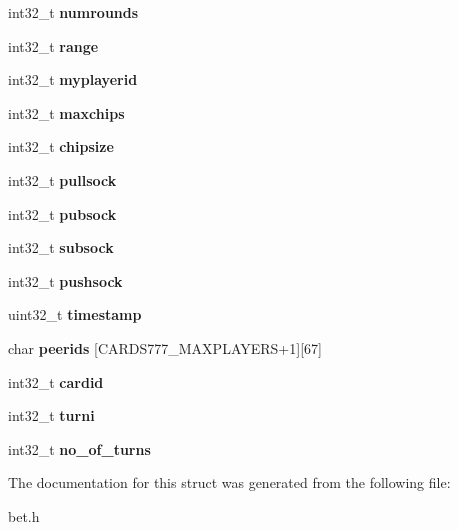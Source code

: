 \begin{DoxyCompactItemize}
\item 
\mbox{\label{structprivatebet__info_ae9386be7e568fdb22e00cb600834fc7b}} 
int32\+\_\+t {\bfseries numrounds}
\item 
\mbox{\label{structprivatebet__info_af01242479bf0e4175782043883b177f8}} 
int32\+\_\+t {\bfseries range}
\item 
\mbox{\label{structprivatebet__info_ad502ebd5a1f56f383db682da311e813e}} 
int32\+\_\+t {\bfseries myplayerid}
\item 
\mbox{\label{structprivatebet__info_a195fee78bb1a26504e4920dafea3b195}} 
int32\+\_\+t {\bfseries maxchips}
\item 
\mbox{\label{structprivatebet__info_a1f4c834e20b87839446da22179d2e58b}} 
int32\+\_\+t {\bfseries chipsize}
\item 
\mbox{\label{structprivatebet__info_a5a624f46decb6be461ec1e4edc0cc140}} 
int32\+\_\+t {\bfseries pullsock}
\item 
\mbox{\label{structprivatebet__info_a2443f8a982fb92f3cab78d35d54aeb24}} 
int32\+\_\+t {\bfseries pubsock}
\item 
\mbox{\label{structprivatebet__info_adf0111f2d0328b929100e926427b5ced}} 
int32\+\_\+t {\bfseries subsock}
\item 
\mbox{\label{structprivatebet__info_aa04b8bcf4acf5ced8cfeaa006cc69249}} 
int32\+\_\+t {\bfseries pushsock}
\item 
\mbox{\label{structprivatebet__info_a41d485812c76258fe86aa2ebb0a43e3b}} 
uint32\+\_\+t {\bfseries timestamp}
\item 
\mbox{\label{structprivatebet__info_a3aa8ce19463aa786e93e92ac4759a6bd}} 
char {\bfseries peerids} \mbox{[}C\+A\+R\+D\+S777\+\_\+\+M\+A\+X\+P\+L\+A\+Y\+E\+RS+1\mbox{]}\mbox{[}67\mbox{]}
\item 
\mbox{\label{structprivatebet__info_ac1a593b6b04f50e52892def22a3fdd53}} 
int32\+\_\+t {\bfseries cardid}
\item 
\mbox{\label{structprivatebet__info_a4a3070b8d22e8ce276a72d45db56353e}} 
int32\+\_\+t {\bfseries turni}
\item 
\mbox{\label{structprivatebet__info_ad37d01428dc307e9deaf5768596e94ef}} 
int32\+\_\+t {\bfseries no\+\_\+of\+\_\+turns}
\end{DoxyCompactItemize}


The documentation for this struct was generated from the following file\+:\begin{DoxyCompactItemize}
\item 
bet.\+h\end{DoxyCompactItemize}
